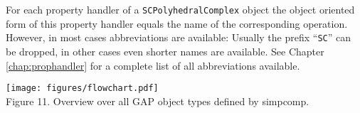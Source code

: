 \documentclass[a4paper,11pt]{report}
\begin{document}
{{ For each property handler of a \texttt{SCPolyhedralComplex} object the object oriented form of this property handler equals the name of
the corresponding operation. However, in most cases abbreviations are
available: Usually the prefix ``\texttt{SC}'' can be dropped, in other cases even shorter names are available. See
Chapter \ref{chap:prophandler} for a complete list of all abbreviations available. }

 

 
	\begin{center}
	\texttt{[image: figures/flowchart.pdf]}\\\bigskip
	{\small Figure 11. Overview over all GAP object types defined by simpcomp.}
	\end{center}
	
	 

 }
\end{document}
